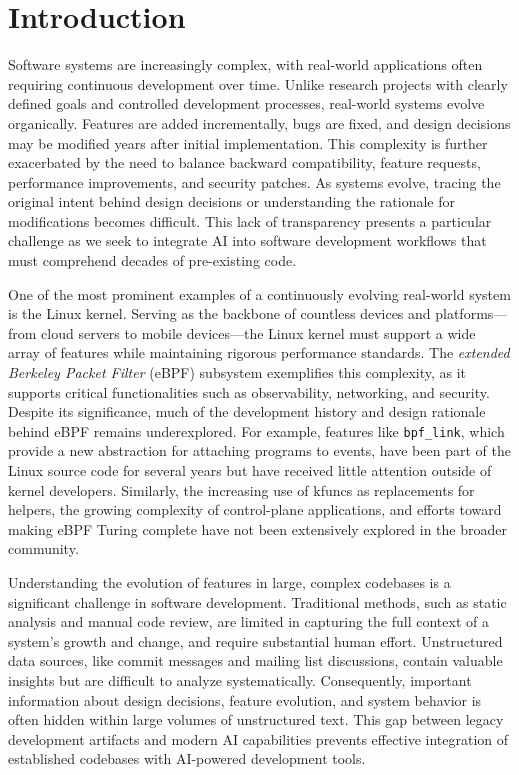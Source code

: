 \documentclass[sigconf,review,anonymous]{acmart}
\begin{document}
\maketitle

\section{Introduction}

Software systems are increasingly complex, with real-world applications often requiring continuous development over time. Unlike research projects with clearly defined goals and controlled development processes, real-world systems evolve organically. Features are added incrementally, bugs are fixed, and design decisions may be modified years after initial implementation. This complexity is further exacerbated by the need to balance backward compatibility, feature requests, performance improvements, and security patches. As systems evolve, tracing the original intent behind design decisions or understanding the rationale for modifications becomes difficult. This lack of transparency presents a particular challenge as we seek to integrate AI into software development workflows that must comprehend decades of pre-existing code.

One of the most prominent examples of a continuously evolving real-world system is the Linux kernel. Serving as the backbone of countless devices and platforms—from cloud servers to mobile devices—the Linux kernel must support a wide array of features while maintaining rigorous performance standards. The \textit{extended Berkeley Packet Filter} (eBPF)\cite{ebpf} subsystem exemplifies this complexity, as it supports critical functionalities such as observability\cite{shen2023network}, networking\cite{vieira2020fast}, and security\cite{deri2019combining}. Despite its significance, much of the development history and design rationale behind eBPF remains underexplored. For example, features like \texttt{bpf\_link}\cite{bpflink}, which provide a new abstraction for attaching programs to events, have been part of the Linux source code for several years but have received little attention outside of kernel developers. Similarly, the increasing use of kfuncs \cite{kfuncs} as replacements for helpers, the growing complexity of control-plane applications, and efforts toward making eBPF Turing complete have not been extensively explored in the broader community.

Understanding the evolution of features in large, complex codebases is a significant challenge in software development\cite{godfrey2008past,mens2008introduction}. Traditional methods, such as static analysis and manual code review, are limited in capturing the full context of a system's growth and change, and require substantial human effort. Unstructured data sources, like commit messages and mailing list discussions, contain valuable insights but are difficult to analyze systematically. Consequently, important information about design decisions, feature evolution, and system behavior is often hidden within large volumes of unstructured text. This gap between legacy development artifacts and modern AI capabilities prevents effective integration of established codebases with AI-powered development tools.
\end{document}
